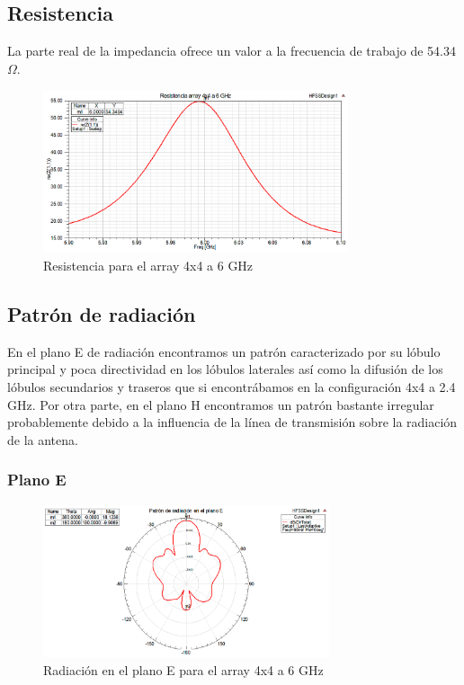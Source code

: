 \subsection{Resistencia}
\par La parte real de la impedancia ofrece un valor a la frecuencia de trabajo de 54.34 $\Omega$.
\\
\begin{figure}[H]
    \centering
        \includegraphics[width=0.8\textwidth]{archivos/analisis/4x42/3}
        \caption{Resistencia para el array 4x4 a 6 GHz}
        \label{fig:resis4x42}
\end{figure}

\subsection{Patrón de radiación}
\par En el plano E de radiación encontramos un patrón caracterizado por su lóbulo principal y poca directividad en los lóbulos laterales así como la difusión de los lóbulos secundarios y traseros que si encontrábamos en la configuración 4x4 a 2.4 GHz. Por otra parte, en el plano H encontramos un patrón bastante irregular probablemente debido a la influencia de la línea de transmisión sobre la radiación de la antena.
\\
\subsubsection{Plano E}
\begin{figure}[H]
    \centering
        \includegraphics[width=0.75\textwidth]{archivos/analisis/4x42/4}
        \caption{Radiación en el plano E para el array 4x4 a 6 GHz}
        \label{fig:E4x42}
\end{figure}

